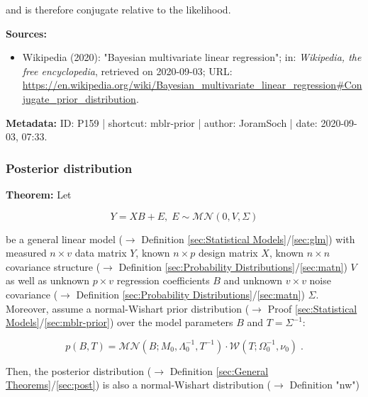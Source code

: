 \documentclass[a4paper,12pt,twoside]{book}
\begin{document}
and is therefore conjugate relative to the likelihood.


\vspace{1em}
\textbf{Sources:}
\begin{itemize}
\item Wikipedia (2020): "Bayesian multivariate linear regression"; in: \textit{Wikipedia, the free encyclopedia}, retrieved on 2020-09-03; URL: \url{https://en.wikipedia.org/wiki/Bayesian_multivariate_linear_regression#Conjugate_prior_distribution}.
\end{itemize}


\vspace{1em}
\textbf{Metadata:} ID: P159 | shortcut: mblr-prior | author: JoramSoch | date: 2020-09-03, 07:33.
\vspace{1em}



\subsubsection[\textbf{Posterior distribution}]{Posterior distribution} \label{sec:mblr-post}
\setcounter{equation}{0}

\textbf{Theorem:} Let

\begin{equation} \label{eq:mblr-post-GLM}
Y = X B + E, \; E \sim \mathcal{MN}(0, V, \Sigma)
\end{equation}

be a general linear model ($\rightarrow$ Definition \ref{sec:Statistical Models}/\ref{sec:glm}) with measured $n \times v$ data matrix $Y$, known $n \times p$ design matrix $X$, known $n \times n$ covariance structure ($\rightarrow$ Definition \ref{sec:Probability Distributions}/\ref{sec:matn}) $V$ as well as unknown $p \times v$ regression coefficients $B$ and unknown $v \times v$ noise covariance ($\rightarrow$ Definition \ref{sec:Probability Distributions}/\ref{sec:matn}) $\Sigma$. Moreover, assume a normal-Wishart prior distribution ($\rightarrow$ Proof \ref{sec:Statistical Models}/\ref{sec:mblr-prior}) over the model parameters $B$ and $T = \Sigma^{-1}$:

\begin{equation} \label{eq:mblr-post-GLM-NW-prior}
p(B,T) = \mathcal{MN}(B; M_0, \Lambda_0^{-1}, T^{-1}) \cdot \mathcal{W}(T; \Omega_0^{-1}, \nu_0) \; .
\end{equation}

Then, the posterior distribution ($\rightarrow$ Definition \ref{sec:General Theorems}/\ref{sec:post}) is also a normal-Wishart distribution ($\rightarrow$ Definition "nw")
\end{document}
